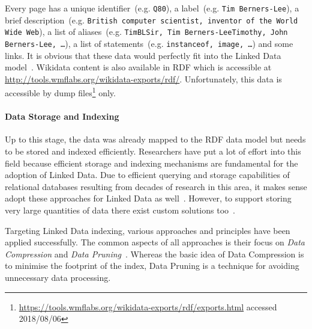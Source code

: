 Every page has a unique identifier~(e.g. \texttt{Q80}), a label~(e.g. \texttt{Tim~Berners-Lee}), a brief description~(e.g. \texttt{British computer scientist, inventor of the World Wide Web}), a list of aliases~(e.g. \texttt{TimBLSir, Tim Berners-LeeTimothy, John Berners-Lee, \ldots}), a list of statements~(e.g. \texttt{instanceof, image, \ldots}) and some links. 
It is obvious that these data would perfectly fit into the Linked Data model~\cite{erxleben2014}.
Wikidata content is also available in RDF which is accessible at \url{http://tools.wmflabs.org/wikidata-exports/rdf/}. Unfortunately, this data is accessible by dump files\footnote{\url{https://tools.wmflabs.org/wikidata-exports/rdf/exports.html} accessed 2018/08/06} only.

\paragraph{Data Storage and Indexing} 
Up to this stage, the data was already mapped to the RDF data model but needs to be stored and indexed efficiently. Researchers have put a lot
of effort into this field because efficient storage and indexing mechanisms are fundamental for the adoption of Linked Data. Due to efficient querying and storage capabilities of relational databases resulting from decades of research in this area, it makes sense adopt these approaches for Linked Data as well~\cite{abadi2007}. However, to support storing very large quantities of data there exist custom solutions too~\cite{broekstra2002}. 

Targeting Linked Data indexing, various approaches and principles have been applied successfully. The common aspects of all approaches is their focus on \emph{Data Compression} and \emph{Data Pruning}~\cite{svoboda2011}. Whereas the basic idea of Data Compression is to minimise the footprint of the index, Data Pruning is a technique for avoiding unnecessary data processing. 

